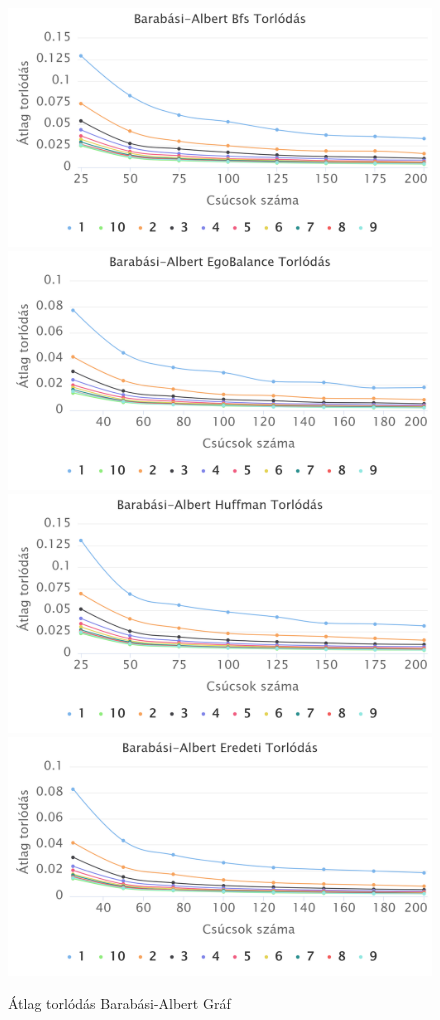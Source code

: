 \documentclass[12pt]{report}
\begin{document}
\begin{figure}[h]
	\begin{center}
		\includegraphics[width=0.49\linewidth]{pictures/barabasi_con_bfs.png}
		\includegraphics[width=0.49\linewidth]{pictures/barabasi_con_egobalance.png}
		\includegraphics[width=0.49\linewidth]{pictures/barabasi_con_huffman.png}
		\includegraphics[width=0.49\linewidth]{pictures/barabasi_con_original.png}
		\caption{Átlag torlódás Barabási-Albert Gráf}
		\label{avg-con-barabasi}
	\end{center}
\end{figure}
\end{document}
